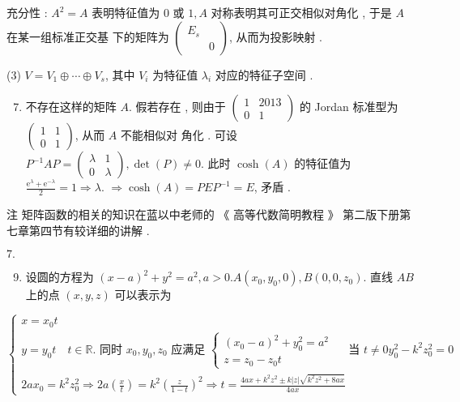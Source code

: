 \documentclass[10pt]{article}
\begin{document}
 充分性 : $A^{2}=A$  表明特征值为  0  或  $1, A$  对称表明其可正交相似对角化 ,  于是  $A$  在某一组标准正交基   下的矩阵为  $\left(\begin{array}{ll}E_{s} & \\ & 0\end{array}\right)$,  从而为投影映射 .

(3) $V=V_{1} \oplus \cdots \oplus V_{s}$,  其中  $V_{i}$  为特征值  $\lambda_{i}$  对应的特征子空间 .

\begin{enumerate}
  \setcounter{enumi}{6}
  \item  不存在这样的矩阵  $A$.  假若存在 ,  则由于  $\left(\begin{array}{cc}1 & 2013 \\ 0 & 1\end{array}\right)$  的  Jordan  标准型为  $\left(\begin{array}{ll}1 & 1 \\ 0 & 1\end{array}\right)$,  从而  $A$  不能相似对   角化 .  可设  $P^{-1} A P=\left(\begin{array}{ll}\lambda & 1 \\ 0 & \lambda\end{array}\right), \operatorname{det}(P) \neq 0$.  此时  $\cosh (A)$  的特征值为  $\frac{\mathrm{e}^{\lambda}+\mathrm{e}^{-\lambda}}{2}=1 \Longrightarrow \lambda$. $\Longrightarrow \cosh (A)=P E P^{-1}=E$,  矛盾 .
\end{enumerate}
 注   矩阵函数的相关的知识在蓝以中老师的 《 高等代数简明教程 》 第二版下册第七章第四节有较详细的讲解 .

$7 .$

\begin{enumerate}
  \setcounter{enumi}{8}
  \item  设圆的方程为  $(x-a)^{2}+y^{2}=a^{2}, a>0 . A\left(x_{0}, y_{0}, 0\right), B\left(0,0, z_{0}\right)$.  直线  $A B$  上的点  $(x, y, z)$  可以表示为 
\end{enumerate}
$$
\left\{\begin{array}{l}
x=x_{0} t \\
y=y_{0} t \quad t \in \mathbb{R} \text {. 同时 } x_{0}, y_{0}, z_{0} \text { 应满足 }\left\{\begin{array}{l}
\left(x_{0}-a\right)^{2}+y_{0}^{2}=a^{2} \\
z=z_{0}-z_{0} t
\end{array} \quad \text { 当 } t \neq 0 y_{0}^{2}-k^{2} z_{0}^{2}=0\right. \\
2 a x_{0}=k^{2} z_{0}^{2} \Longrightarrow 2 a\left(\frac{x}{t}\right)=k^{2}\left(\frac{z}{1-t}\right)^{2} \Longrightarrow t=\frac{4 a x+k^{2} z^{2} \pm k|z| \sqrt{k^{2} z^{2}+8 a x}}{4 a x}
\end{array}\right.
$$
\end{document}
